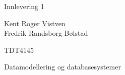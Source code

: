 \begin{titlepage}
   \begin{center}
        \vspace*{4cm} %

        \Huge{\titleofdoc} 

        \vspace{0.5cm}
        \LARGE{Innlevering 1}
            
        \vspace{3 cm}
        \Large{\GroupName}
       
        \vspace{0.25cm}
        \large{Kent Roger Vistven\\Fredrik Randsborg Bølstad}
       
        \vspace{3 cm}
        \Large{TDT4145}
        
        \vspace{0.1 cm}
        \Large{Datamodellering og databasesystemer}

       \vfill
    \end{center}
\end{titlepage}